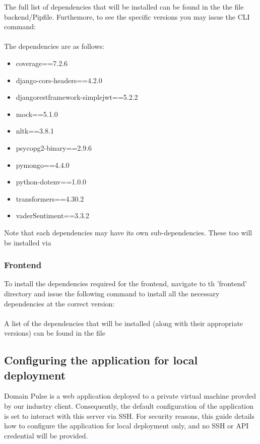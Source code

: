 \documentclass[12pt]{article}
\begin{document}
The full list of dependencies that will be installed can be found in the the file backend/Pipfile. Furthemore, to see the specific versions you may issue the CLI command:\\
 \\
The dependencies are as follows:
\begin{itemize}
    \item coverage==7.2.6
    \item django-cors-headers==4.2.0
    \item djangorestframework-simplejwt==5.2.2
    \item mock==5.1.0
    \item nltk==3.8.1
    \item psycopg2-binary==2.9.6
    \item pymongo==4.4.0
    \item python-dotenv==1.0.0
    \item transformers==4.30.2
    \item vaderSentiment==3.3.2
\end{itemize}
Note that each dependencies may have its own sub-dependencies. These too will be installed via 

\subsubsection{Frontend}
To install the dependencies required for the frontend, navigate to th 'frontend' directory and issue the following command to install
all the necessary dependencies at the correct version: \\
\\
A list of the dependencies that will be installed (along with their appropriate versions) can be found in the file 


\subsection{Configuring the application for local deployment}
Domain Pulse is a web application deployed to a private virtual machine provded by our industry client. Consequently, the default
configuration of the application is set to interact with this server via SSH. For security reasons, this guide details how to configure
the application for local deployment only, and no SSH or API credential will be provided.
\end{document}
